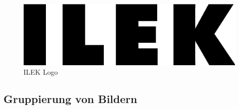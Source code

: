 \begin{figure}[H]
  \centering  
  	\includegraphics[scale=0.5]{Images/ILEK-logo.jpg}
  \caption{ILEK Logo}
  \label{fig:starwars}
\end{figure}

\subsection{Gruppierung von Bildern}

